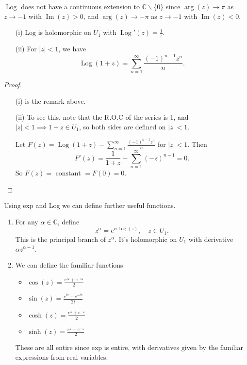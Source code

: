 \documentclass[egregdoesnotlikesansseriftitles,a4paper]{scrartcl}
\begin{document}
\begin{remark}
      $\operatorname{Log}$ does not have a continuous extension to $\mathbb{C} \backslash\{0\}$ since $\arg (z) \rightarrow \pi$ as $z \rightarrow-1$ with $\operatorname{Im}(z)>0$, and $\arg (z) \rightarrow-\pi$ as $z \rightarrow-1$ with $\operatorname{Im}(z)<0$.
\end{remark}
\begin{proposition}
      \begin{itemize}
           \item[(i)] Log is holomorphic on $U_1 $ with $\operatorname{Log}' (z)=\frac{1}{z}$. 
           \item[(ii)] For $|z|<1$, we have \[
           \operatorname{Log}(1+z)=\sum_{n=1}^{ \infty} \frac{(-1)^{n-1}z^{n}}{n}
           .\] 
      \end{itemize} 
\end{proposition}
\begin{proof}
      \begin{itemize}
           \item[(i)] is the remark above. 
           \item[(ii)] To see this, note that the R.O.C of the series is 1, and $|z|<1 \implies 1+z \in U_1 $, so both sides are defined on $|z|<1$. 
           
           Let $F (z)=\operatorname{Log}(1+z)-\sum_{n=1}^{ \infty} \frac{(-1)^{n-1}z^{n}}{n}$ for $|z|<1$. Then \[
           F' (z)= \frac{1}{1+z}-\sum_{n=1}^{ \infty}(-z)^{n-1}=0
           .\] So $F (z)=\text{ constant } =F (0)=0$.
      \end{itemize}
\end{proof}
Using exp and Log we can define further useful functions. 
\begin{enumerate}
     \item For any $\alpha \in \mathbb{C}$, define \[
     z^{\alpha}=e^{\alpha \operatorname{Log}(z)}, \quad z \in U_1 
     .\] This is the principal branch of $z^{\alpha}$. It's holomorphic on $U_1 $ with derivative $\alpha z^{\alpha-1}$. 
     \item We can define the familiar functions 
     \begin{itemize}
          \item $\cos (z)= \frac{e^{iz}+e^{-iz}}{2}$ 
          \item $\sin (z)= \frac{e^{iz}-e^{-iz}}{2i}$ 
          \item $\cosh (z)= \frac{e^{z}+e^{-z}}{2}$ 
          \item $\sinh (z)= \frac{e^{z}-e^{-z}}{2}$ 
     \end{itemize}
     These are all entire since exp is entire, with derivatives given by the familiar expressions from real variables.
\end{enumerate}
\end{document}
